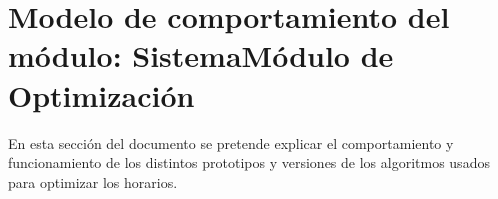 \newpage

\section{Modelo de comportamiento del módulo: Sistema{Módulo de Optimización}}\label{chp:moduloOpt}

En esta sección del documento se pretende explicar el comportamiento y funcionamiento de los distintos prototipos y versiones de los algoritmos usados para optimizar los horarios.

